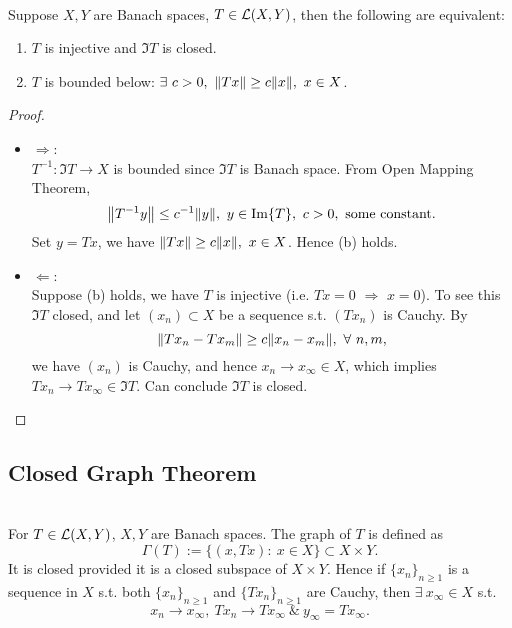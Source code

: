 \vspace{3pt}
\begin{corollary}\ \\
Suppose $X,Y$ are Banach spaces, $T \in \mathcal{L}(X,Y)$, then the following are equivalent:
\begin{enumerate}[label = (\alph*)]
    \item $T$ is injective and $\Im{T}$ is closed.
    \item $T$ is bounded below: $\exists\ c > 0,\ \norm{Tx} \geq c \norm{x},\ x\in X$.
\end{enumerate}
\end{corollary}
\begin{proof}\ \\
\begin{itemize}
    \item $\Rightarrow:$\ \\
    $T^{-1}: \Im{T} \to X$ is bounded since $\Im{T}$ is Banach space. From Open Mapping Theorem, 
\begin{equation*}
    \norm{T^{-1} y} \leq c^{-1} \norm{y},\ y \in \Im{T},\ c > 0, \text{ some constant}.
\end{equation*}
Set $y = Tx$, we have $\norm{Tx} \geq c\norm{x},\ x \in X$. Hence (b) holds.
    \item $\Leftarrow:$\ \\
    Suppose (b) holds, we have $T$ is injective (i.e. $Tx = 0$ $\Rightarrow$ $x = 0$). To see this $\Im{T}$ closed, and let $(x_n) \subset X$ be a sequence s.t. $(Tx_n)$ is Cauchy. By
    \begin{equation*}
        \norm{Tx_n - Tx_m} \geq c\norm{x_n - x_m},\ \forall\ n,m,
    \end{equation*}
    we have $(x_n)$ is Cauchy, and hence $x_n \to x_\infty \in X$, which implies $Tx_n \to Tx_\infty \in \Im{T}$. Can conclude $\Im{T}$ is closed.
\end{itemize}
\end{proof}


\subsection{Closed Graph Theorem}

\begin{definition}\ \\
For $T \in \mathcal{L}(X,Y)$, $X,Y$ are Banach spaces. The graph of $T$ is defined as
\begin{equation*}
    \Gamma(T):= \{(x,Tx):\ x \in X\} \subset X \times Y.
\end{equation*}
It is closed provided it is a closed subspace of $X \times Y$. Hence if $\{x_n\}_{n \geq 1}$ is a sequence in $X$ s.t. both $\{x_n\}_{n \geq 1}$ and $\{Tx_n\}_{n \geq 1}$ are Cauchy, then $\exists\ x_\infty \in X$ s.t.
\begin{equation*}
    x_n \to x_\infty,\ Tx_n \to Tx_\infty\ \&\ y_\infty = Tx_\infty.
\end{equation*}
\end{definition}


